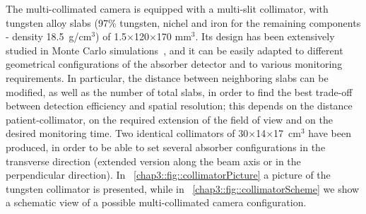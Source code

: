 The multi-collimated camera is equipped with a multi-slit collimator, with tungsten alloy slabs (97\% tungsten, nichel and iron for the remaining components - density 18.5~g/cm$^3$) of 1.5$\times$120$\times$170 mm$\mathrm{^{3}}$. Its design has been extensively studied in Monte Carlo simulations~\parencite{Pinto2014}, and it can be easily adapted to different geometrical configurations of the absorber detector and to various monitoring requirements. In particular, the distance between neighboring slabs can be modified, as well as the number of total slabs, in order to find the best trade-off between detection efficiency and spatial resolution; this depends on the distance patient-collimator, on the required extension of the field of view and on the desired monitoring time. Two identical collimators of 30$\times$14$\times$17~cm$^{3}$ have been produced, in order to be able to set several absorber configurations in the transverse direction (extended version along the beam axis or in the perpendicular direction). In \figurename~\ref{chap3::fig::collimatorPicture} a picture of the tungsten collimator is presented, while in \figurename~\ref{chap3::fig::collimatorScheme} we show a schematic view of a possible multi-collimated camera configuration.


